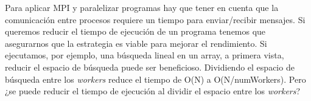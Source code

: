 	
	Para aplicar MPI y paralelizar programas hay que tener en cuenta que la comunicación entre procesos requiere un tiempo para enviar/recibir mensajes. Si queremos reducir el tiempo de ejecución de un programa tenemos que asegurarnos que la estrategia es viable para mejorar el rendimiento. Si ejecutamos, por ejemplo, una búsqueda lineal en un array, a primera vista, reducir el espacio de búsqueda puede ser beneficioso. Dividiendo el espacio de búsqueda entre los \textit{workers} reduce el tiempo de O(N) a O(N/numWorkers). Pero ¿se puede reducir el tiempo de ejecución al dividir el espacio entre los \textit{workers}? 
	
